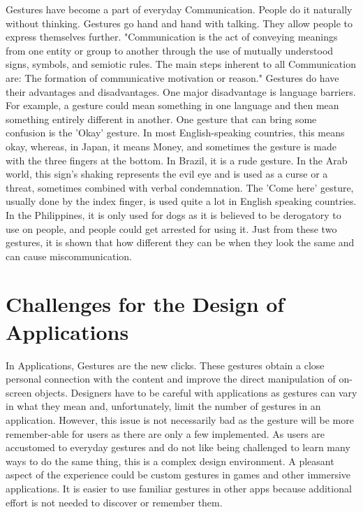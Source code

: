 \documentclass{article}
\begin{document}
Gestures have become a part of everyday Communication. People do it naturally without thinking. Gestures go hand and hand with talking. They allow people to express themselves further. "Communication is the act of conveying meanings from one entity or group to another through the use of mutually understood signs, symbols, and semiotic rules. The main steps inherent to all Communication are: The formation of communicative motivation or reason." \cite{ref14}
Gestures do have their advantages and disadvantages. One major disadvantage is language barriers. For example, a gesture could mean something in one language and then mean something entirely different in another. One gesture that can bring some confusion is the 'Okay' gesture. In most English-speaking countries, this means okay, whereas, in Japan, it means Money, and sometimes the gesture is made with the three fingers at the bottom. In Brazil, it is a rude gesture. In the Arab world, this sign's shaking represents the evil eye and is used as a curse or a threat, sometimes combined with verbal condemnation. The 'Come here' gesture, usually done by the index finger, is used quite a lot in English speaking countries. In the Philippines, it is only used for dogs as it is believed to be derogatory to use on people, and people could get arrested for using it. Just from these two gestures, it is shown that how different they can be when they look the same and can cause miscommunication.
\cite{ref15}

\section{Challenges for the Design of Applications}

In Applications, Gestures are the new clicks. These gestures obtain a close personal connection with the content and improve the direct manipulation of on-screen objects. Designers have to be careful with applications as gestures can vary in what they mean and, unfortunately, limit the number of gestures in an application. However, this issue is not necessarily bad as the gesture will be more remember-able for users as there are only a few implemented. As users are accustomed to everyday gestures and do not like being challenged to learn many ways to do the same thing, this is a complex design environment. A pleasant aspect of the experience could be custom gestures in games and other immersive applications. It is easier to use familiar gestures in other apps because additional effort is not needed to discover or remember them.
\cite{ref16}
\end{document}
